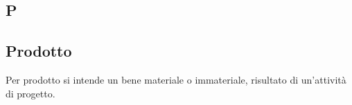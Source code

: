 \subsection*{P}

\subsection*{Prodotto}

        Per prodotto si intende un bene materiale o immateriale, risultato di un'attività di progetto.